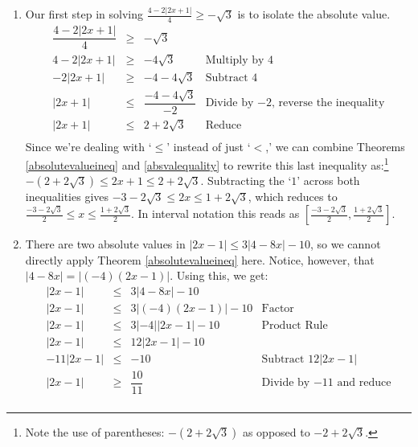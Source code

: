 \documentclass{ximera}
\begin{document}
\begin{example}
\begin{enumerate}
\item  Our first step in solving $\frac{4 - 2|2x+1|}{4} \geq -\sqrt{3}$ is to isolate the absolute value. \[ \begin{array}{rclr}
\dfrac{4 - 2|2x+1|}{4} & \geq & -\sqrt{3} & \\  

4 - 2|2x+1| & \geq & -4\sqrt{3} & \text{Multiply by $4$} \\
- 2|2x+1| & \geq & -4-4\sqrt{3} & \text{Subtract $4$} \\
|2x+1| & \leq & \dfrac{-4-4\sqrt{3}}{-2} & \text{Divide by $-2$,  reverse the inequality} \\  
|2x+1| & \leq & 2 + 2\sqrt{3} & \text{Reduce} \\ 

\end{array}\] Since we're dealing with `$\leq$' instead of just `$<$,' we can combine Theorems \ref{absolutevalueineq} and  \ref{absvalequality} to rewrite this last inequality as:\footnote{Note the use of parentheses: $-(2+2\sqrt{3})$ as opposed to $-2 + 2\sqrt{3}$.}   $-(2 + 2\sqrt{3}) \leq 2x+1 \leq 2+2\sqrt{3}$. Subtracting the `$1$' across both inequalities gives $-3-2\sqrt{3} \leq 2x \leq 1 + 2\sqrt{3}$, which reduces to $\frac{-3-2\sqrt{3}}{2} \leq x \leq \frac{1+2\sqrt{3}}{2}$.  In interval notation this reads as  $\left[\frac{-3-2\sqrt{3}}{2}, \frac{1+2\sqrt{3}}{2}\right]$.

\item  There are two absolute values in $|2x - 1| \leq 3|4 - 8x| - 10$, so we cannot directly apply Theorem \ref{absolutevalueineq} here. Notice, however, that $|4 - 8x| = |(-4)(2x-1)|$.   Using this, we get:\[ \begin{array}{rclr}

|2x - 1| & \leq & 3|4 - 8x| - 10 & \\

|2x - 1| & \leq & 3|(-4)(2x-1)| - 10 & \text{Factor}\\

|2x - 1| & \leq & 3|-4||2x-1| - 10 & \text{Product Rule}\\

|2x - 1| & \leq & 12|2x-1| - 10 & \\

-11|2x - 1| & \leq & - 10 & \text{Subtract $12|2x-1|$} \\

|2x - 1| & \geq  & \dfrac{10}{11} & \text{Divide by $-11$ and reduce} \\


\end{array}\]
\end{enumerate}
\end{example}
\end{document}
